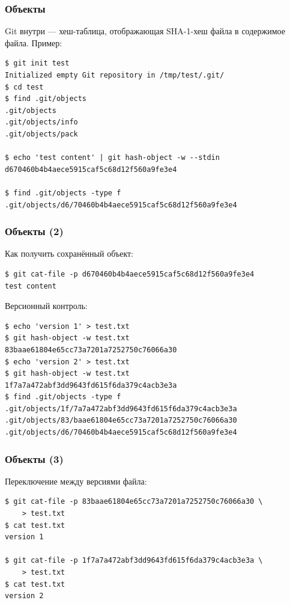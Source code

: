 \documentclass[xetex,mathserif,serif]{beamer}
\begin{document}
	\begin{frame}[fragile]
		\frametitle{Объекты}
		Git внутри --- хеш-таблица, отображающая SHA-1-хеш файла в содержимое файла. Пример:
		\begin{verbatim}
$ git init test
Initialized empty Git repository in /tmp/test/.git/
$ cd test
$ find .git/objects
.git/objects
.git/objects/info
.git/objects/pack

$ echo 'test content' | git hash-object -w --stdin
d670460b4b4aece5915caf5c68d12f560a9fe3e4

$ find .git/objects -type f
.git/objects/d6/70460b4b4aece5915caf5c68d12f560a9fe3e4
		\end{verbatim}
	\end{frame}

	\begin{frame}[fragile]
		\frametitle{Объекты (2)}
		Как получить сохранённый объект:
		\begin{verbatim}
$ git cat-file -p d670460b4b4aece5915caf5c68d12f560a9fe3e4
test content
		\end{verbatim}

		Версионный контроль:
		\begin{verbatim}
$ echo 'version 1' > test.txt
$ git hash-object -w test.txt
83baae61804e65cc73a7201a7252750c76066a30
$ echo 'version 2' > test.txt
$ git hash-object -w test.txt
1f7a7a472abf3dd9643fd615f6da379c4acb3e3a
$ find .git/objects -type f
.git/objects/1f/7a7a472abf3dd9643fd615f6da379c4acb3e3a
.git/objects/83/baae61804e65cc73a7201a7252750c76066a30
.git/objects/d6/70460b4b4aece5915caf5c68d12f560a9fe3e4
		\end{verbatim}
	\end{frame}

	\begin{frame}[fragile]
		\frametitle{Объекты (3)}
		Переключение между версиями файла:
		\begin{verbatim}
$ git cat-file -p 83baae61804e65cc73a7201a7252750c76066a30 \
    > test.txt
$ cat test.txt
version 1

$ git cat-file -p 1f7a7a472abf3dd9643fd615f6da379c4acb3e3a \
    > test.txt
$ cat test.txt
version 2
		\end{verbatim}
	\end{frame}
\end{document}
